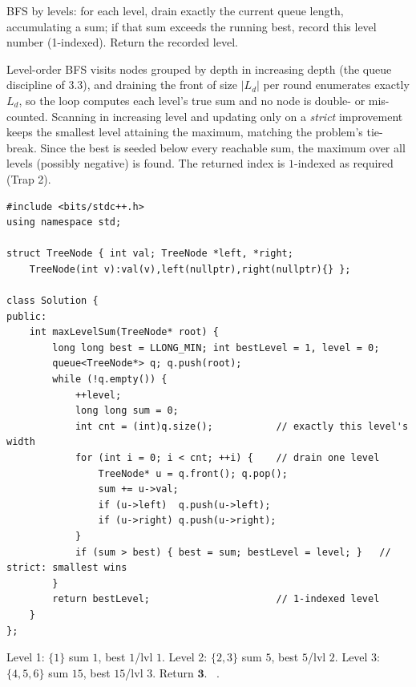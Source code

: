 BFS by levels: for each level, drain exactly the current queue length, accumulating a sum; if
that sum exceeds the running best, record this level number (1-indexed). Return the recorded
level.

\begin{proofbox}
Level-order BFS visits nodes grouped by depth in increasing depth (the queue discipline of
 3.3), and draining the front of size $|L_d|$ per round enumerates exactly $L_d$,
so the loop computes each level's true sum and no node is double- or mis-counted. Scanning in
increasing level and updating only on a \emph{strict} improvement keeps the smallest level
attaining the maximum, matching the problem's tie-break. Since the best is seeded below every
reachable sum, the maximum over all levels (possibly negative) is found. The returned index is
$1$-indexed as required (Trap 2).
\end{proofbox}

\begin{lstlisting}[caption={Maximum Level Sum via level BFS (LeetCode 1161)}, label={lst:c24-levelsum}]
#include <bits/stdc++.h>
using namespace std;

struct TreeNode { int val; TreeNode *left, *right;
    TreeNode(int v):val(v),left(nullptr),right(nullptr){} };

class Solution {
public:
    int maxLevelSum(TreeNode* root) {
        long long best = LLONG_MIN; int bestLevel = 1, level = 0;
        queue<TreeNode*> q; q.push(root);
        while (!q.empty()) {
            ++level;
            long long sum = 0;
            int cnt = (int)q.size();           // exactly this level's width
            for (int i = 0; i < cnt; ++i) {    // drain one level
                TreeNode* u = q.front(); q.pop();
                sum += u->val;
                if (u->left)  q.push(u->left);
                if (u->right) q.push(u->right);
            }
            if (sum > best) { best = sum; bestLevel = level; }   // strict: smallest wins
        }
        return bestLevel;                      // 1-indexed level
    }
};
\end{lstlisting}

\begin{tracebox}
Level 1: $\{1\}$ sum $1$, best $1$/lvl $1$. Level 2: $\{2,3\}$ sum $5$, best $5$/lvl $2$.
Level 3: $\{4,5,6\}$ sum $15$, best $15$/lvl $3$. Return $\mathbf{3}$. \checkmark\
.
\end{tracebox}

